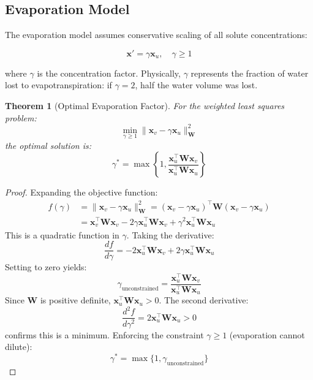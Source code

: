 \documentclass[12pt,a4paper]{article}
\theoremstyle{plain}
\newtheorem{theorem}{Theorem}[section]
\theoremstyle{definition}
\theoremstyle{remark}
\begin{document}
\subsection{Evaporation Model}

The evaporation model assumes conservative scaling of all solute concentrations:

\begin{equation}\label{eq:evaporation}
	\mathbf{x}' = \gamma \mathbf{x}_u, \quad \gamma \geq 1
\end{equation}

where $\gamma$ is the concentration factor. Physically, $\gamma$ represents the fraction of water lost to evapotranspiration: if $\gamma = 2$, half the water volume was lost.

\begin{theorem}[Optimal Evaporation Factor]\label{thm:evap_optimal}
	For the weighted least squares problem:
	\begin{equation}
		\min_{\gamma \geq 1} \|\mathbf{x}_v - \gamma \mathbf{x}_u\|_{\mathbf{W}}^2
	\end{equation}
	the optimal solution is:
	\begin{equation}\label{eq:gamma_optimal}
		\gamma^* = \max\left\{1, \frac{\mathbf{x}_u^\top \mathbf{W} \mathbf{x}_v}{\mathbf{x}_u^\top \mathbf{W} \mathbf{x}_u}\right\}
	\end{equation}
\end{theorem}

\begin{proof}
	Expanding the objective function:
	\begin{align}
		f(\gamma) & = \|\mathbf{x}_v - \gamma \mathbf{x}_u\|_{\mathbf{W}}^2 = (\mathbf{x}_v - \gamma \mathbf{x}_u)^\top \mathbf{W} (\mathbf{x}_v - \gamma \mathbf{x}_u)  \\
		          & = \mathbf{x}_v^\top \mathbf{W} \mathbf{x}_v - 2\gamma \mathbf{x}_u^\top \mathbf{W} \mathbf{x}_v + \gamma^2 \mathbf{x}_u^\top \mathbf{W} \mathbf{x}_u
	\end{align}
	This is a quadratic function in $\gamma$. Taking the derivative:
	\begin{equation}
		\frac{df}{d\gamma} = -2 \mathbf{x}_u^\top \mathbf{W} \mathbf{x}_v + 2\gamma \mathbf{x}_u^\top \mathbf{W} \mathbf{x}_u
	\end{equation}
	Setting to zero yields:
	\begin{equation}
		\gamma_{\text{unconstrained}} = \frac{\mathbf{x}_u^\top \mathbf{W} \mathbf{x}_v}{\mathbf{x}_u^\top \mathbf{W} \mathbf{x}_u}
	\end{equation}
	Since $\mathbf{W}$ is positive definite, $\mathbf{x}_u^\top \mathbf{W} \mathbf{x}_u > 0$. The second derivative:
	\begin{equation}
		\frac{d^2f}{d\gamma^2} = 2 \mathbf{x}_u^\top \mathbf{W} \mathbf{x}_u > 0
	\end{equation}
	confirms this is a minimum. Enforcing the constraint $\gamma \geq 1$ (evaporation cannot dilute):
	\begin{equation}
		\gamma^* = \max\{1, \gamma_{\text{unconstrained}}\}
	\end{equation}
\end{proof}
\end{document}
